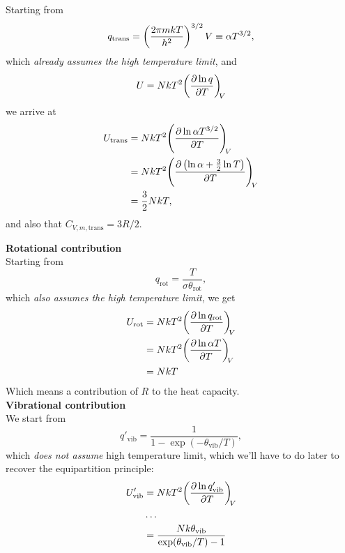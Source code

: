 Starting from
\begin{equation}
q_{\text{trans}}=\left(\frac{2\pi mkT}{h^2} \right)^{3/2}V\equiv\alpha T^{3/2},
\end{equation}
which \emph{already assumes the high temperature limit}, and 
\begin{equation}
U=NkT^2\diffp{\ln q}{T}[V]
\end{equation}
we arrive at
\begin{equation}
\begin{aligned}
U_{\text{trans}}&=NkT^2\diffp{\ln\alpha T^{3/2}}{T}[V]\\
&=NkT^2\diffp{\lf(\ln\alpha+\frac{3}{2}\ln T \rt)}{T}[V]\\
&=\frac{3}{2}NkT,
\end{aligned}
\end{equation}
and also that $C_{V,m,\text{trans}}=3R/2$.\par
\textbf{Rotational contribution}\\
Starting from
\begin{equation}
	q_{\text{rot}}=\frac{T}{\sigma\theta_{\text{rot}}},
\end{equation}
which \emph{also assumes the high temperature limit}, we get 
\begin{equation}
\begin{aligned}
	U_{\text{rot}}&=NkT^2\diffp{\ln{q_{\text{rot}}}}{T}[V]\\
	&=NkT^2\diffp{\ln{\alpha T}}{T}[V]\\
	&=NkT
\end{aligned}
\end{equation}
Which means a contribution of $R$ to the heat capacity.\\
\textbf{Vibrational contribution}\\
We start from
\begin{equation}
\label{qvib}
	q'_{\text{vib}}=\frac{1}{1-\exp(-\theta_{\text{vib}}/T)},
\end{equation}
which \emph{does not assume} high temperature limit, which we'll have to do later to recover the equipartition principle:
\begin{equation}
\label{uvib}
\begin{aligned}
	U'_{\text{vib}}&=NkT^2\diffp{\ln q'_{\text{vib}}}{T}[V]\\
	&\dots\\
	&=\frac{Nk\theta_{\text{vib}}}{\exp(\theta_{\text{vib}}/T)-1}
\end{aligned}
\end{equation}

